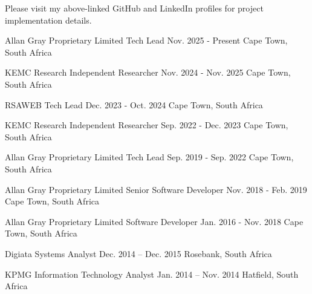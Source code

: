     \begin{cvparagraph}

        \:\:\:\:\:\:\:\:\:\:\:\:\:\:\:\:\:\:\:\:\:\:\:\:\:\:\:\:\:\:\:\:\:\:\:\:\:\:\:\:\:\:\:\:\:\:Please visit my above-linked GitHub and LinkedIn profiles for project implementation details.
    \end{cvparagraph}
    \begin{cventries}
        \cventry
            {Allan Gray Proprietary Limited}
            {Tech Lead}
            {Nov. 2025 - Present}
            {Cape Town, South Africa}
            {}

        \cventry
            {KEMC Research}
            {Independent Researcher}
            {Nov. 2024 - Nov. 2025}
            {Cape Town, South Africa}
            {}

        \cventry
            {RSAWEB}
            {Tech Lead}
            {Dec. 2023 - Oct. 2024}
            {Cape Town, South Africa}
            {}

        \cventry
            {KEMC Research}
            {Independent Researcher}
            {Sep. 2022 - Dec. 2023}
            {Cape Town, South Africa}
            {}

        \cventry
            {Allan Gray Proprietary Limited}
            {Tech Lead}
            {Sep. 2019 - Sep. 2022}
            {Cape Town, South Africa}
            {}

        \cventry
            {Allan Gray Proprietary Limited}
            {Senior Software Developer}
            {Nov. 2018 - Feb. 2019}
            {Cape Town, South Africa}
            {}

        \cventry
            {Allan Gray Proprietary Limited}
            {Software Developer}
            {Jan. 2016 - Nov. 2018}
            {Cape Town, South Africa}
            {}

        \cventry
            {Digiata}
            {Systems Analyst}
            {Dec. 2014 – Dec. 2015}
            {Rosebank, South Africa}
            {}

        \cventry
            {KPMG}
            {Information Technology Analyst}
            {Jan. 2014 – Nov. 2014}
            {Hatfield, South Africa}
            {}
    \end{cventries}

